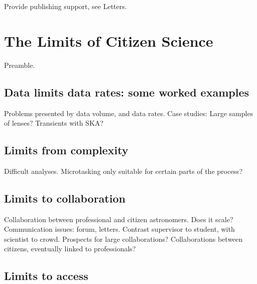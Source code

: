 \documentclass{ar2e}
\begin{document}
Provide publishing support, see Letters.



\section{The Limits of Citizen Science}
\label{sec:limits}

Preamble.


\subsection{Data limits data rates: some worked examples}
\label{sec:limits:data}

Problems presented by data volume, and data rates. 
Case studies: Large samples of lenses?  Transients with SKA? 



\subsection{Limits from complexity}
\label{sec:limits:complexity}

Difficult analyses. Microtasking only suitable for certain parts of the process?



\subsection{Limits to collaboration}
\label{sec:limits:collab}

Collaboration between professional and citizen astronomers. Does it scale?
Communication issues: forum, letters. Contrast supervisor to student, with
scientist to crowd. Prospects for large collaborations? Collaborations between
citizens, eventually linked to professionals?



\subsection{Limits to access}
\label{sec:limits:access}
\end{document}
